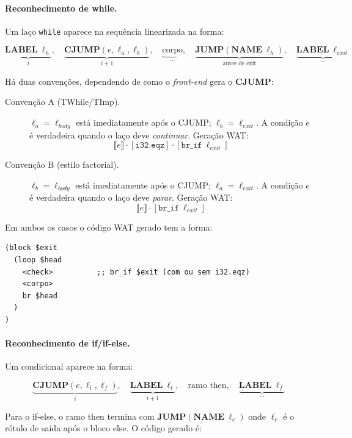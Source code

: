 \paragraph{Reconhecimento de while.}
Um laço \texttt{while} aparece na sequência linearizada na forma:

\[
  \underbrace{\mathbf{LABEL}\ \ell_h}_{i},\quad
  \underbrace{\mathbf{CJUMP}(e, \ell_a, \ell_b)}_{i+1},\quad
  \underbrace{\text{corpo}}_{\ldots},\quad
  \underbrace{\mathbf{JUMP}(\mathbf{NAME}\ \ell_h)}_{\text{antes de exit}},\quad
  \underbrace{\mathbf{LABEL}\ \ell_{\mathit{exit}}}_{\ldots}
\]

Há duas convenções, dependendo de como o \emph{front-end} gera o \textbf{CJUMP}:

\begin{description}
  \item[Convenção A (TWhile/TImp).] $\ell_a = \ell_{\mathit{body}}$ está
    imediatamente após o CJUMP; $\ell_b = \ell_{\mathit{exit}}$.  A condição
    $e$ é verdadeira quando o laço deve \emph{continuar}.  Geração WAT:
    \[
      \llbracket e \rrbracket \cdot [\mathtt{i32.eqz}] \cdot
      [\mathtt{br\_if}\ \ell_{\mathit{exit}}]
    \]
  \item[Convenção B (estilo factorial).] $\ell_b = \ell_{\mathit{body}}$ está
    imediatamente após o CJUMP; $\ell_a = \ell_{\mathit{exit}}$.  A condição
    $e$ é verdadeira quando o laço deve \emph{parar}.  Geração WAT:
    \[
      \llbracket e \rrbracket \cdot [\mathtt{br\_if}\ \ell_{\mathit{exit}}]
    \]
\end{description}

Em ambos os casos o código WAT gerado tem a forma:

\begin{verbatim}
(block $exit
  (loop $head
    <check>          ;; br_if $exit (com ou sem i32.eqz)
    <corpo>
    br $head
  )
)
\end{verbatim}

\paragraph{Reconhecimento de if/if-else.}
Um condicional aparece na forma:

\[
  \underbrace{\mathbf{CJUMP}(e, \ell_t, \ell_f)}_{i},\quad
  \underbrace{\mathbf{LABEL}\ \ell_t}_{i+1},\quad
  \text{ramo then},\quad
  \underbrace{\mathbf{LABEL}\ \ell_f}_{\ldots}
\]

Para o if-else, o ramo then termina com $\mathbf{JUMP}(\mathbf{NAME}\ \ell_e)$
onde $\ell_e$ é o rótulo de saída após o bloco else.  O código gerado é:

